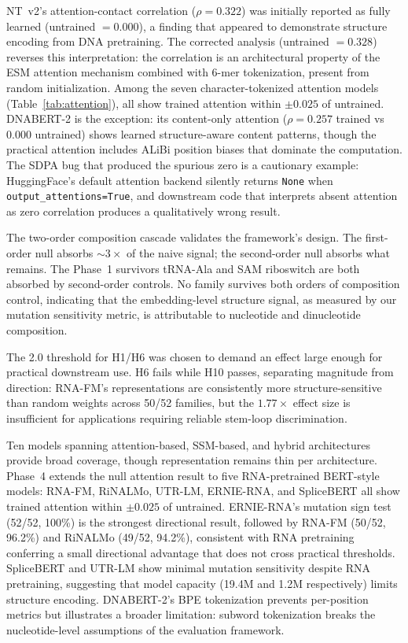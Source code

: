 \documentclass[11pt]{article}
\begin{document}
NT~v2's attention-contact correlation ($\rho = 0.322$) was initially
reported as fully learned (untrained $= 0.000$), a finding that
appeared to demonstrate structure encoding from DNA pretraining.  The
corrected analysis (untrained $= 0.328$) reverses this
interpretation: the correlation is an architectural property of the
ESM attention mechanism combined with 6-mer tokenization, present from
random initialization.  Among the seven character-tokenized attention
models (Table~\ref{tab:attention}), all show trained attention within
$\pm 0.025$ of untrained.  DNABERT-2 is the exception: its
content-only attention ($\rho = 0.257$ trained vs $0.000$ untrained)
shows learned structure-aware content patterns, though the practical
attention includes ALiBi position biases that dominate the
computation.  The SDPA bug that produced the spurious zero is a
cautionary example: HuggingFace's default attention backend silently
returns \texttt{None} when \texttt{output\_attentions=True}, and
downstream code that interprets absent attention as zero correlation
produces a qualitatively wrong result.

The two-order composition cascade validates the framework's design.
The first-order null absorbs ${\sim}3\times$ of the naive signal; the
second-order null absorbs what remains.  The Phase~1 survivors
tRNA-Ala and SAM riboswitch are both absorbed by second-order
controls.  No family survives both orders of composition control,
indicating that the embedding-level structure signal, as measured by
our mutation sensitivity metric, is attributable to nucleotide and
dinucleotide composition.

The 2.0 threshold for H1/H6 was chosen to demand an effect large
enough for practical downstream use.  H6 fails while H10 passes,
separating magnitude from direction: RNA-FM's representations are
consistently more structure-sensitive than random weights across
50/52 families, but the $1.77\times$ effect size is insufficient for
applications requiring reliable stem-loop discrimination.

Ten models spanning attention-based, SSM-based, and hybrid
architectures provide broad coverage, though representation remains
thin per architecture.  Phase~4 extends the null attention result to
five RNA-pretrained BERT-style models: RNA-FM, RiNALMo, UTR-LM,
ERNIE-RNA, and SpliceBERT all show trained attention within $\pm
0.025$ of untrained.  ERNIE-RNA's mutation sign test (52/52, 100\%)
is the strongest directional result, followed by RNA-FM (50/52,
96.2\%) and RiNALMo (49/52, 94.2\%), consistent with RNA pretraining
conferring a small directional advantage that does not cross practical
thresholds.  SpliceBERT and UTR-LM show minimal mutation sensitivity
despite RNA pretraining, suggesting that model capacity (19.4M and
1.2M respectively) limits structure encoding.  DNABERT-2's BPE
tokenization prevents per-position metrics but illustrates a broader
limitation: subword tokenization breaks the nucleotide-level
assumptions of the evaluation framework.
\end{document}
